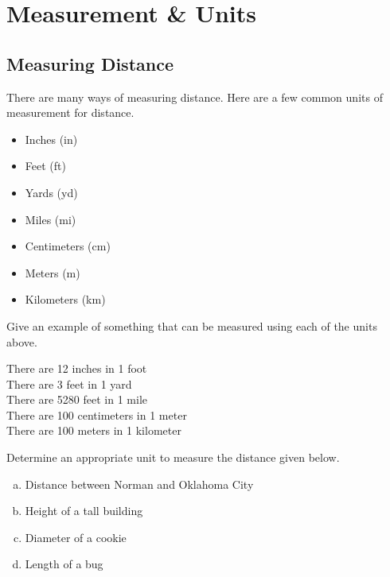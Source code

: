 \documentclass[notes]{subfiles}
\begin{document}
	\fancyhead[LO,RE]{\bfseries \currentname}
	\fancyfoot[C]{{}}
	\fancyfoot[RO,LE]{\large \thepage}	%

\section*{Measurement \& Units}\label{measurement}
	\subsection*{Measuring Distance}
		There are many ways of measuring distance.  Here are a few common units of measurement for distance.%
		
		\begin{itemize}
			\item Inches (in)%
			\item Feet (ft)%
			\item Yards (yd)%
			\item Miles (mi)%
			\item Centimeters (cm)%
			\item Meters (m)%
			\item Kilometers (km)%
		\end{itemize}

		\begin{ex}
			Give an example of something that can be measured using each of the units above.
		\end{ex}
			
		\begin{rmk}
			\tabitem There are 12 inches in 1 foot\\[15pt]
			\tabitem There are 3 feet in 1 yard\\[15pt]
			\tabitem There are 5280 feet in 1 mile\\[15pt]
			\tabitem There are 100 centimeters in 1 meter\\[15pt]
			\tabitem There are 100 meters in 1 kilometer
		\end{rmk}
			\newpage
			
		\begin{ex}
			Determine an appropriate unit to measure the distance given below.%
			\begin{enumerate}[(a)]
				\item Distance between Norman and Oklahoma City%
					
				\item Height of a tall building%
					
				\item Diameter of a cookie%
					
				\item Length of a bug%
			\end{enumerate}
		\end{ex}
		
\end{document}
